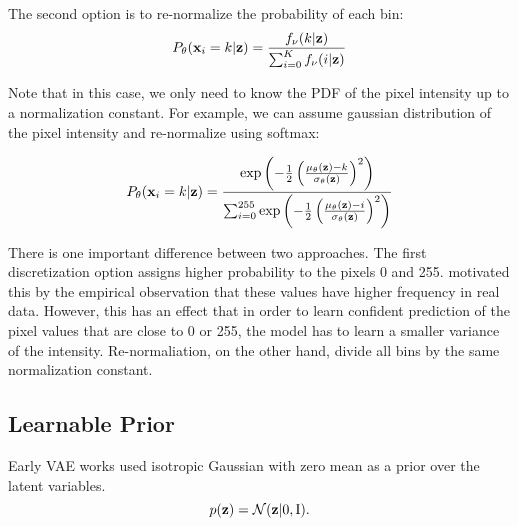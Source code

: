 The second option is to re-normalize the probability of each bin:
\begin{equation}\label{eq:intro_softmax_discr}
\begin{aligned}
    P_{\theta}(\rvx_i = k|\rvz) = \frac{f_{\nu}(k|\rvz)}{\sum_{i=0}^K f_{\nu}(i|\rvz)}
\end{aligned}
\end{equation}

Note that in this case, we only need to know the PDF of the pixel intensity up to a normalization constant. For example, we can assume gaussian distribution of the pixel intensity and re-normalize using softmax:

\begin{equation}
\begin{aligned}
    P_{\theta}({\mathbf{x}}_i = k|{\mathbf{z}}) = \frac{\exp\left(-\frac12 \left(\frac{\mu_{\theta}({\mathbf{z}}) - k}{\sigma_{\theta}({\mathbf{z}})}\right)^2\right)}{\sum_{i=0}^{255} \exp\left(-\frac12 \left(\frac{\mu_{\theta}({\mathbf{z}}) - i}{\sigma_{\theta}({\mathbf{z}})}\right)^2\right)}
\end{aligned}
\end{equation}

There is one important difference between two approaches. The first discretization option assigns higher probability to the pixels 0 and 255. \citet{salimans2016improved} motivated this by the empirical observation that these values have higher frequency in real data. However, this has an effect that in order to learn confident prediction of the pixel values that are close to 0 or 255, the model has to learn a smaller variance of the intensity. Re-normaliation, on the other hand, divide all bins by the same normalization constant.







\subsection{Learnable Prior}
Early VAE works used isotropic Gaussian with zero mean as a prior over the latent variables.
\begin{equation}
    p({\mathbf{z}}) = \mathcal{N}({\mathbf{z}} | 0, \text{I}).
\end{equation}

